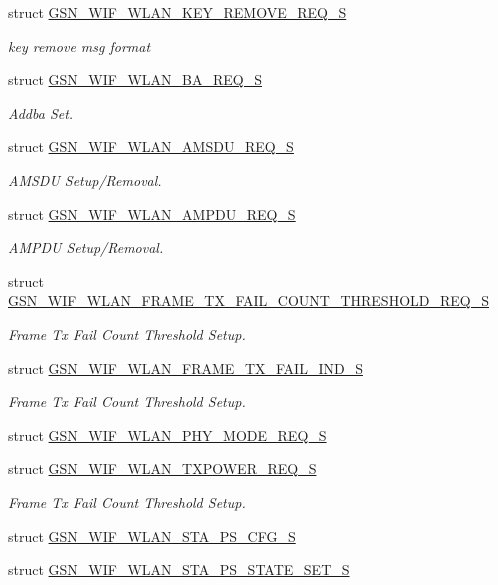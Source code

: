 \begin{DoxyCompactItemize}
struct \hyperlink{a00387}{GSN\_\-WIF\_\-WLAN\_\-KEY\_\-REMOVE\_\-REQ\_\-S}
\begin{DoxyCompactList}\small\item\em key remove msg format \end{DoxyCompactList}\item 
struct \hyperlink{a00370}{GSN\_\-WIF\_\-WLAN\_\-BA\_\-REQ\_\-S}
\begin{DoxyCompactList}\small\item\em Addba Set. \end{DoxyCompactList}\item 
struct \hyperlink{a00367}{GSN\_\-WIF\_\-WLAN\_\-AMSDU\_\-REQ\_\-S}
\begin{DoxyCompactList}\small\item\em AMSDU Setup/Removal. \end{DoxyCompactList}\item 
struct \hyperlink{a00366}{GSN\_\-WIF\_\-WLAN\_\-AMPDU\_\-REQ\_\-S}
\begin{DoxyCompactList}\small\item\em AMPDU Setup/Removal. \end{DoxyCompactList}\item 
struct \hyperlink{a00381}{GSN\_\-WIF\_\-WLAN\_\-FRAME\_\-TX\_\-FAIL\_\-COUNT\_\-THRESHOLD\_\-REQ\_\-S}
\begin{DoxyCompactList}\small\item\em Frame Tx Fail Count Threshold Setup. \end{DoxyCompactList}\item 
struct \hyperlink{a00382}{GSN\_\-WIF\_\-WLAN\_\-FRAME\_\-TX\_\-FAIL\_\-IND\_\-S}
\begin{DoxyCompactList}\small\item\em Frame Tx Fail Count Threshold Setup. \end{DoxyCompactList}\item 
struct \hyperlink{a00393}{GSN\_\-WIF\_\-WLAN\_\-PHY\_\-MODE\_\-REQ\_\-S}
\item 
struct \hyperlink{a00411}{GSN\_\-WIF\_\-WLAN\_\-TXPOWER\_\-REQ\_\-S}
\begin{DoxyCompactList}\small\item\em Frame Tx Fail Count Threshold Setup. \end{DoxyCompactList}\item 
struct \hyperlink{a00403}{GSN\_\-WIF\_\-WLAN\_\-STA\_\-PS\_\-CFG\_\-S}
\item 
struct \hyperlink{a00405}{GSN\_\-WIF\_\-WLAN\_\-STA\_\-PS\_\-STATE\_\-SET\_\-S}

\end{DoxyCompactItemize}
